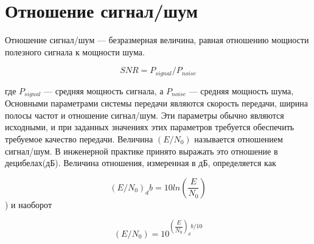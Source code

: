 \section{Отношение сигнал/шум}
Отношение сигнал/шум --- безразмерная величина, равная отношению мощности полезного сигнала к мощности шума.

\[ SNR=P_{signal}/P_{noise} \]

где $P_{signal}$ --- средняя мощность сигнала, а $P_{noise}$ --- средняя мощность шума,
Основными параметрами системы передачи являются скорость передачи, ширина полосы частот и отношение сигнал/шум. Эти параметры обычно являются исходными, и при заданных значениях этих параметров требуется обеспечить требуемое качество передачи.
Величина $(E/N_0)$ называется отношением сигнал/шум.  В инженерной практике принято выражать это отношение в децибелах(дБ).  Величина отношения, измеренная в дБ, определяется как

\[(E/N_0)_db=10ln⁡(\dfrac{E}{N_{0}})\])
и наоборот

\[(E/N_0)=10^{(\dfrac{E}{N_{0}})_db/10} \]   
